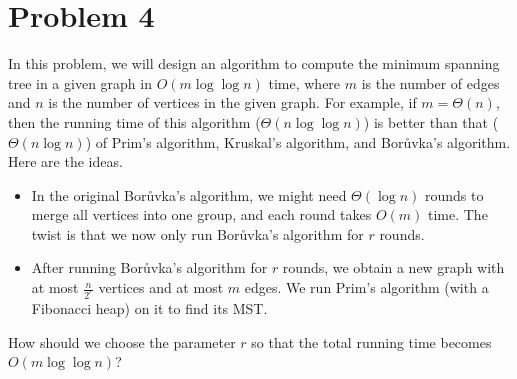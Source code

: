 \section*{Problem 4}
In this problem, we will design an algorithm to compute the minimum spanning tree in a given graph in $O(m \log \log n)$ time, where $m$ is the number of edges and $n$ is the number of vertices in the given graph. For example, if $m = \Theta(n)$, then the running time of this algorithm ($\Theta(n \log \log n)$) is better than that ($\Theta(n \log n)$) of Prim's algorithm, Kruskal's algorithm, and Bor\r{u}vka's algorithm.
Here are the ideas.
\begin{itemize}
    \item In the original Bor\r{u}vka's algorithm, we might need $\Theta(\log n)$ rounds to merge all vertices into one group, and each round takes $O(m)$ time. The twist is that we now only run Bor\r{u}vka's algorithm for $r$ rounds.
    \item After running Bor\r{u}vka's algorithm for $r$ rounds, we obtain a new graph with at most $\frac{n}{2^r}$ vertices and at most $m$ edges. We run Prim's algorithm (with a Fibonacci heap) on it to find its MST.
\end{itemize}
How should we choose the parameter $r$ so that the total running time becomes $O(m \log \log n)$?


